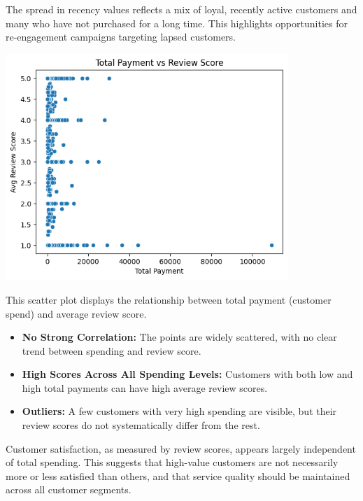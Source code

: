 \documentclass[a4paper]{article}
\begin{document}
\begin{multicols}{2}
The spread in recency values reflects a mix of loyal, recently active customers and many who have not purchased for a long time. This highlights opportunities for re-engagement campaigns targeting lapsed customers.

\vspace{1em}

\noindent
\begin{minipage}{\columnwidth}
\centering
\includegraphics[width=0.8\textwidth]{plots/Total Payment vs Review Score.png}
\label{fig:total_payment_vs_review}
\end{minipage}

This scatter plot displays the relationship between total payment (customer spend) and average review score.

\begin{itemize}
    \item \textbf{No Strong Correlation:} The points are widely scattered, with no clear trend between spending and review score.
    \item \textbf{High Scores Across All Spending Levels:} Customers with both low and high total payments can have high average review scores.
    \item \textbf{Outliers:} A few customers with very high spending are visible, but their review scores do not systematically differ from the rest.
\end{itemize}

Customer satisfaction, as measured by review scores, appears largely independent of total spending. This suggests that high-value customers are not necessarily more or less satisfied than others, and that service quality should be maintained across all customer segments.



\end{multicols}
\end{document}
